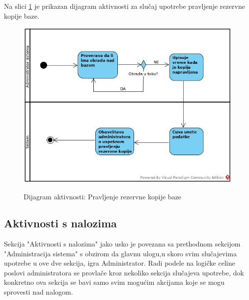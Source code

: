 \documentclass[20pt]{article}
\begin{document}
\setlength{\parindent}{1cm}
\fontsize{13}{18} \selectfont 
Na slici \ref{fig:dijagramAktivnostiKopiranjaBaze} je prikazan dijagram aktivnosti za slu\v{c}aj upotrebe pravljenje rezervne kopije baze.\\

\begin{figure}[h]
		\centering
		\includegraphics[width=1.1\textwidth,height=0.59\textheight]{Pictures/PravljenjeRezervneKopije.jpg}\\
		\caption{Dijagram aktivnosti: Pravljenje rezervne kopije baze}
		\label{fig:dijagramAktivnostiKopiranjaBaze}
	\end{figure}
\newpage
\subsection{\bfseries \Large Aktivnosti s nalozima}
\setlength{\parindent}{1cm}
\fontsize{13}{18} \selectfont 

\indent Sekcija "Aktivnosti s nalozima" jako usko je povezana sa prethodnom sekcijom "Administracija sistema" s obzirom da glavnu ulogu,u skoro svim slu\v {c}ajevima upotrebe u ove dve sekcija, igra Administrator. Radi podele na logi\v {c}ke celine poslovi administratora se provla\v {c}e kroz nekoliko sekcija slu\v {c}ajeva upotrebe, dok konkretno ova sekcija se bavi samo svim mogu\' cim akcijama koje se mogu sprovesti nad nalogom.\\
\end{document}
